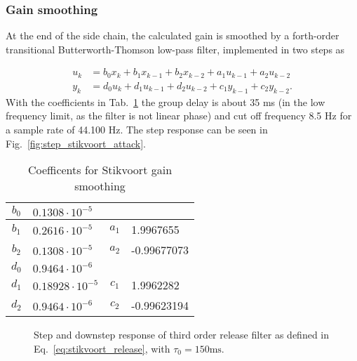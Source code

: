 \documentclass[../main2.tex]{subfiles}
\providecommand{\rootdir}{..}
\begin{document}
\subsubsection{Gain smoothing}
At the end of the side chain, the calculated gain is smoothed by a forth-order transitional Butterworth-Thomson low-pass filter, implemented in two steps as

\begin{equation}\label{eq:stikvoort_attack}
\begin{split}
u_k &= b_0 x_k + b_1 x_{k-1} + b_2 x_{k-2} + a_1 u_{k-1} + a_2 u_{k-2}\\
y_k &= d_0 u_k + d_1 u_{k-1} + d_2 u_{k-2} + c_1 y_{k-1} + c_2 y_{k-2}.
\end{split}
\end{equation}
With the coefficients in Tab.~\ref{tab:coeff_stikvoort_attack}  the group delay is about 35 ms (in the low frequency limit, as the filter is not linear phase) and cut off frequency 8.5 Hz for a sample rate of 44.100 Hz. The step response can be seen in Fig.~\ref{fig:step_stikvoort_attack}. 

\begin{table}[h]
\begin{center}
 \begin{tabular}{ c l | c l}	
    \hline
    $b_0$ & $0.1308 \cdot 10^{-5}$ &              &                          \\ \hline
    $b_1$ & $0.2616 \cdot 10^{-5}$ & $a_1$ & 1.9967655     \\ \hline
    $b_2$ & $0.1308 \cdot 10^{-5}$ & $a_2$ & -0.99677073  \\ \hline \hline

    $d_0$ & $0.9464  \cdot 10^{-6}$   &         &                             \\ \hline
    $d_1$ & $0.18928 \cdot 10^{-5}$ & $c_1$ & 1.9962282     \\ \hline
    $d_2$ & $0.9464  \cdot 10^{-6}$  & $c_2$ & -0.99623194  \\ \hline
\end{tabular}
\caption{Coefficents for Stikvoort gain smoothing}
\label{tab:coeff_stikvoort_attack}
\end{center}
\end{table}

\FloatBarrier
\begin{figure}
\centerline{}
\caption{Step and downstep response of third order release filter as defined in Eq.~\eqref{eq:stikvoort_release}, with $\tau_0 = 150 \text{ms}$.}
\label{fig:step_stikvoort_release}
\end{figure}
\end{document}
